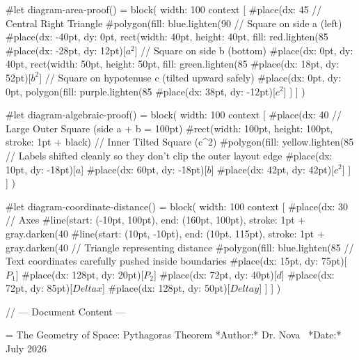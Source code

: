 #let diagram-area-proof() = block(
  width: 100%
  context [
    #place(dx: 45%
      // Central Right Triangle
      #polygon(fill: blue.lighten(90%
      // Square on side a (left)
      #place(dx: -40pt, dy: 0pt, rect(width: 40pt, height: 40pt, fill: red.lighten(85%
      #place(dx: -28pt, dy: 12pt)[$a^2$]
      // Square on side b (bottom)
      #place(dx: 0pt, dy: 40pt, rect(width: 50pt, height: 50pt, fill: green.lighten(85%
      #place(dx: 18pt, dy: 52pt)[$b^2$]
      // Square on hypotenuse c (tilted upward safely)
      #place(dx: 0pt, dy: 0pt, polygon(fill: purple.lighten(85%
      #place(dx: 38pt, dy: -12pt)[$c^2$]
    ]
  ]
)

#let diagram-algebraic-proof() = block(
  width: 100%
  context [
    #place(dx: 40%
      // Large Outer Square (side a + b = 100pt)
      #rect(width: 100pt, height: 100pt, stroke: 1pt + black)
      // Inner Tilted Square (c^2)
      #polygon(fill: yellow.lighten(85%
      // Labels shifted cleanly so they don't clip the outer layout edge
      #place(dx: 10pt, dy: -18pt)[$a$]
      #place(dx: 60pt, dy: -18pt)[$b$]
      #place(dx: 42pt, dy: 42pt)[$c^2$]
    ]
  ]
)

#let diagram-coordinate-distance() = block(
  width: 100%
  context [
    #place(dx: 30%
      // Axes
      #line(start: (-10pt, 100pt), end: (160pt, 100pt), stroke: 1pt + gray.darken(40%
      #line(start: (10pt, -10pt), end: (10pt, 115pt), stroke: 1pt + gray.darken(40%
      // Triangle representing distance
      #polygon(fill: blue.lighten(85%
      // Text coordinates carefully pushed inside boundaries
      #place(dx: 15pt, dy: 75pt)[$P_1$]
      #place(dx: 128pt, dy: 20pt)[$P_2$]
      #place(dx: 72pt, dy: 40pt)[$d$]
      #place(dx: 72pt, dy: 85pt)[$Delta x$]
      #place(dx: 128pt, dy: 50pt)[$Delta y$]
    ]
  ]
)

// --- Document Content ---

= The Geometry of Space: Pythagoras Theorem
*Author:* Dr. Nova \
*Date:* July 2026

